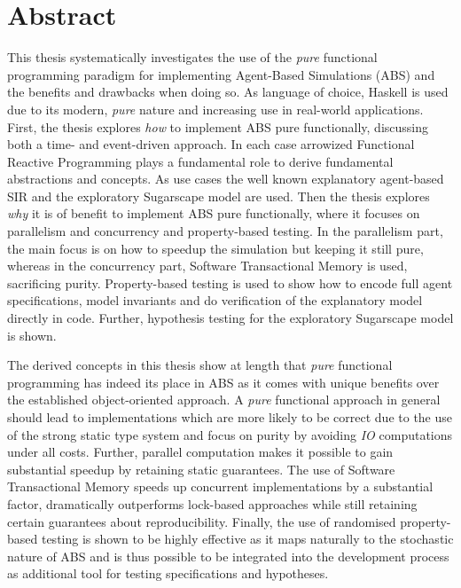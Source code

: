 \documentclass[oneside]{book}
\newcommand\blankpage{%
    \null
    \thispagestyle{empty}%
    \addtocounter{page}{-1}%
    \newpage}
\begin{document}
\cleardoublepage
\afterpage{\blankpage}

\clearpage
\tableofcontents

\newpage

\thispagestyle{plain}

\section*{Abstract}
This thesis systematically investigates the use of the \textit{pure} functional programming paradigm for implementing Agent-Based Simulations (ABS) and the benefits and drawbacks when doing so. As language of choice, Haskell is used due to its modern, \textit{pure} nature and increasing use in real-world applications. First, the thesis explores \textit{how} to implement ABS pure functionally, discussing both a time- and event-driven approach. In each case arrowized Functional Reactive Programming plays a fundamental role to derive fundamental abstractions and concepts. As use cases the well known explanatory agent-based SIR and the exploratory Sugarscape model are used. Then the thesis explores \textit{why} it is of benefit to implement ABS pure functionally, where it focuses on parallelism and concurrency and property-based testing. In the parallelism part, the main focus is on how to speedup the simulation but keeping it still pure, whereas in the concurrency part, Software Transactional Memory is used, sacrificing purity. Property-based testing is used to show how to encode full agent specifications, model invariants and do verification of the explanatory model directly in code. Further, hypothesis testing for the exploratory Sugarscape model is shown.

The derived concepts in this thesis show at length that \textit{pure} functional programming has indeed its place in ABS as it comes with unique benefits over the established object-oriented approach. A \textit{pure} functional approach in general should lead to implementations which are more likely to be correct due to the use of the strong static type system and focus on purity by avoiding \textit{IO} computations under all costs. Further, parallel computation makes it possible to gain substantial speedup by retaining static guarantees. The use of Software Transactional Memory speeds up concurrent implementations by a substantial factor, dramatically outperforms lock-based approaches while still retaining certain guarantees about reproducibility. Finally, the use of randomised property-based testing is shown to be highly effective as it maps naturally to the stochastic nature of ABS and is thus possible to be integrated into the development process as additional tool for testing specifications and hypotheses.
\end{document}
